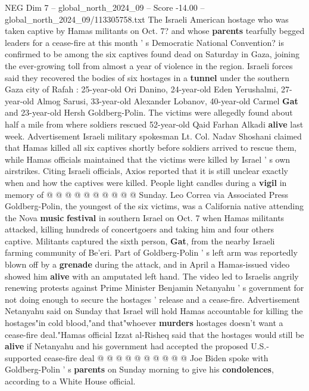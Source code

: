 \begin{textsample}{NEG Dim 7 – global\_north\_2024\_09 – Score -14.00 – global\_north\_2024\_09/113305758.txt}  \label{ex:f7_neg_004}
The Israeli American hostage who was taken captive by Hamas militants on Oct. 7? and whose \textbf{parents} tearfully begged leaders for a cease-fire at this month ' s Democratic National Convention? is confirmed to be among the six captives found dead on Saturday in Gaza, joining the ever-growing toll from almost a year of violence in the region.
Israeli forces said they recovered the bodies of six hostages in a \textbf{tunnel} under the southern Gaza city of Rafah : 25-year-old Ori Danino, 24-year-old Eden Yerushalmi, 27-year-old Almog Sarusi, 33-year-old Alexander Lobanov, 40-year-old Carmel \textbf{Gat} and 23-year-old Hersh Goldberg-Polin.
The victims were allegedly found about half a mile from where soldiers rescued 52-year-old Qaid Farhan Alkadi \textbf{alive} last week.
Advertisement Israeli military spokesman Lt.
Col.
Nadav Shoshani claimed that Hamas killed all six captives shortly before soldiers arrived to rescue them, while Hamas officials maintained that the victims were killed by Israel ' s own airstrikes.
Citing Israeli officials, Axios reported that it is still unclear exactly when and how the captives were killed.
People light candles during a \textbf{vigil} in memory of @ @ @ @ @ @ @ @ @ @ Sunday.
Leo Correa via Associated Press Goldberg-Polin, the youngest of the six victims, was a California native attending the Nova \textbf{music} \textbf{festival} in southern Israel on Oct. 7 when Hamas militants attacked, killing hundreds of concertgoers and taking him and four others captive.
Militants captured the sixth person, \textbf{Gat}, from the nearby Israeli farming community of Be'eri.
Part of Goldberg-Polin ' s left arm was reportedly blown off by a \textbf{grenade} during the attack, and in April a Hamas-issued video showed him \textbf{alive} with an amputated left hand.
The video led to Israelis angrily renewing protests against Prime Minister Benjamin Netanyahu ' s government for not doing enough to secure the hostages ' release and a cease-fire.
Advertisement Netanyahu said on Sunday that Israel will hold Hamas accountable for killing the hostages"in cold blood,"and that"whoever \textbf{murders} hostages doesn't want a cease-fire deal."Hamas official Izzat al-Risheq said that the hostages would still be \textbf{alive} if Netanyahu and his government had accepted the proposed U.S.-supported cease-fire deal @ @ @ @ @ @ @ @ @ @ Joe Biden spoke with Goldberg-Polin ' s \textbf{parents} on Sunday morning to give his \textbf{condolences}, according to a White House official.

\end{textsample}
